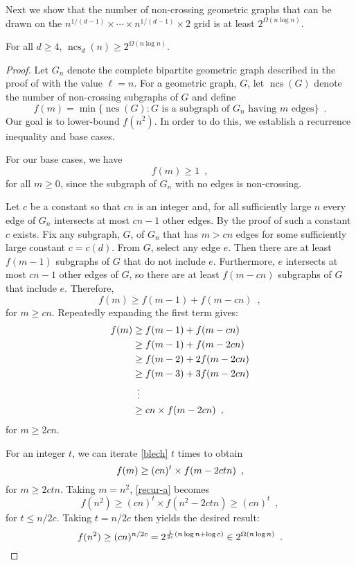 \documentclass{patmorin}
\DeclareMathOperator{\ncs}{ncs}
\begin{document}
Next we show that the number of non-crossing geometric graphs that can
be drawn on the $n^{1/(d-1)}\times \cdots\times n^{1/(d-1)}\times 2$
grid is at least $2^{\Omega(n\log n)}$.

\begin{thm}
  For all $d\ge 4$, $\ncs_d(n) \ge 2^{\Omega(n\log n)}$.
\end{thm}

\begin{proof}
  Let $G_n$ denote the complete bipartite geometric graph described in
  the proof of  with the value $\ell=n$.  For a
  geometric graph, $G$, let $\ncs(G)$ denote the number of non-crossing
  subgraphs of $G$ and define
  \[
     f(m) = \min\{ \ncs(G) : 
                \mbox{$G$ is a subgraph of $G_{n}$ having $m$ edges} \}
     \enspace . 
  \]
  Our goal is to lower-bound $f(n^2)$.  In order to do this, we establish
  a recurrence inequality and base cases.
  
  For our base cases, we have 
  \[ 
     f(m)\ge 1 \enspace ,
  \]
  for all $m\ge 0$, since the subgraph of $G_{n}$ with no edges is
  non-crossing.
  
  Let $c$ be a constant so that $cn$ is an integer and, for all sufficiently
  large $n$ every edge of $G_n$ intersects at most $cn-1$ other edges.
  By the proof of  such a constant $c$ exists.
  Fix any subgraph, $G$, of $G_{n}$ that has $m> cn$ edges for some
  sufficiently large constant $c=c(d)$.  From $G$, select any edge $e$. Then
  there are at least $f(m-1)$ subgraphs of $G$ that do not include $e$.
  Furthermore, $e$ intersects at most $cn-1$ other edges of $G$, so there
  are at least $f(m-cn)$ subgraphs of $G$ that include $e$.  Therefore,
  \[  
     f(m) \ge f(m-1) + f(m-cn) \enspace ,
  \]
  for $m\ge cn$.  Repeatedly expanding the first term gives:
  \begin{align}
  f(m) & \ge  f(m-1) + f(m-cn) \notag \\
         & \ge  f(m-1) + f(m-2cn) \notag \\
         & \ge  f(m-2) + 2f(m-2cn) \notag \\
         & \ge  f(m-3) + 3f(m-2cn) \notag \\
         & \,\,\,\vdots  \notag \\
         & \ge  cn\times f(m-2cn) \enspace , \eqlabel{blech}
  \end{align}
  for $m\ge 2cn$.
  
  For an integer $t$, we can iterate \eqref{blech} $t$ times to obtain
  \begin{equation}
     f(m) \ge (cn)^t\times f(m-2ctn) \enspace ,
     \eqlabel{recur-a}
  \end{equation} 
  for $m\ge 2ctn$.  Taking $m=n^2$, \eqref{recur-a} becomes
  \[
     f(n^2) \ge (cn)^t\times f(n^2-2ctn) \ge (cn)^t \enspace ,
  \]
  for $t \le n/2c$.  Taking $t=n/2c$ then yields the desired result:
  \[
     f(n^2) \ge (cn)^{n/2c} 
            = 2^{\frac{1}{2c}(n\log n+\log c)} 
            \in 2^{\Omega(n\log n)} \enspace . \qedhere
  \]
\end{proof}
\end{document}
